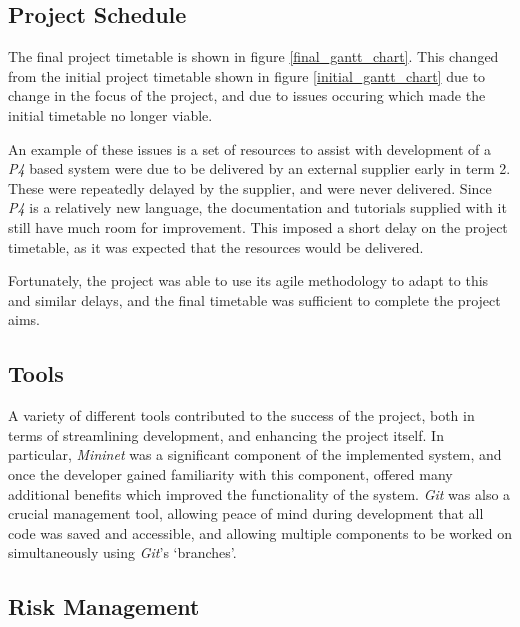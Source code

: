 \subsection{Project Schedule}
The final project timetable is shown in figure \ref{final_gantt_chart}. This changed from the initial project timetable shown in figure \ref{initial_gantt_chart} due to change in the focus of the project, and due to issues occuring which made the initial timetable no longer viable.

An example of these issues is a set of resources to assist with development of a \textit{P4} based system were due to be delivered by an external supplier early in term 2.
These were repeatedly delayed by the supplier, and were never delivered.
Since \textit{P4} is a relatively new language, the documentation and tutorials supplied with it still have much room for improvement. This imposed a short delay on the project timetable, as it was expected that the resources would be delivered.

Fortunately, the project was able to use its agile methodology to adapt to this and similar delays, and the final timetable was sufficient to complete the project aims.

\subsection{Tools}
A variety of different tools contributed to the success of the project, both in terms of streamlining development, and enhancing the project itself. In particular, \textit{Mininet} was a significant component of the implemented system, and once the developer gained familiarity with this component, offered many additional benefits which improved the functionality of the system. \textit{Git} was also a crucial management tool, allowing peace of mind during development that all code was saved and accessible, and allowing multiple components to be worked on simultaneously using \textit{Git}'s `branches'.


\subsection{Risk Management}


